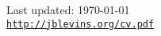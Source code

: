 \documentclass[letterpaper]{article}
\renewenvironment{itemize}{
  \begin{list}{}{
    \setlength{\leftmargin}{1em}
  }
}{
  \end{list}
}
\begin{document}
% 
%         
% 


\bigskip

\begin{center}
\begin{footnotesize}
Last updated: \today \\
\href{http://jblevins.org/cv}{\tt http://jblevins.org/cv.pdf}
\end{footnotesize}
\end{center}
\end{document}
